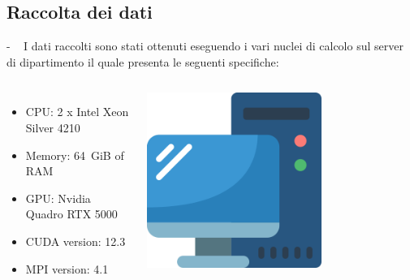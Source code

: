 \documentclass[compress]{beamer}
\begin{document}
\subsection{Raccolta dei dati}
\begin{frame}{\secname \text{ }- \subsecname\ }
    I dati raccolti sono stati ottenuti eseguendo i vari nuclei di calcolo sul server di dipartimento il quale presenta le seguenti specifiche:
    \begin{columns}
            \begin{minipage}[b]{1\textwidth}
                \begin{itemize}
                    \item CPU: 2 x Intel Xeon Silver 4210
                    \item Memory: 64 GiB of RAM
                    \item GPU: Nvidia Quadro RTX 5000
                    \item CUDA version: 12.3
                    \item MPI version: 4.1
                \end{itemize}
            \end{minipage}
            \begin{minipage}{1\textwidth}
                \begin{adjustbox}{margin=0cm 0cm 0cm 0.6cm, center} %
                    \includegraphics[width=0.65\textwidth]{resources/pc.png}
                \end{adjustbox}
            \end{minipage}
    \end{columns}
\end{frame}
\end{document}
